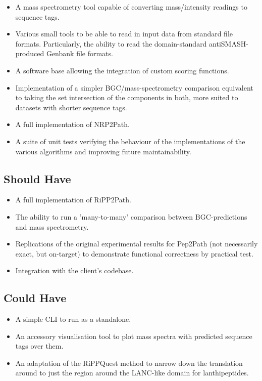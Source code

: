 \documentclass{l4proj}
\begin{document}
\begin{itemize}

\item A mass spectrometry tool capable of converting mass/intensity readings to sequence tags.
\item Various small tools to be able to read in input data from standard file formats. Particularly, the ability to read the domain-standard antiSMASH-produced Genbank file formats.
\item A software base allowing the integration of custom scoring functions.
\item Implementation of a simpler BGC/mass-spectrometry comparison equivalent to taking the set intersection of the components in both, more suited to datasets with shorter sequence tags.
\item A full implementation of NRP2Path.
\item A suite of unit tests verifying the behaviour of the implementations of the various algorithms and improving future maintainability.
\end{itemize}

\subsection{Should Have}

\begin{itemize}
\item A full implementation of RiPP2Path.
\item The ability to run a 'many-to-many' comparison between BGC-predictions and mass spectrometry.
\item Replications of the original experimental results for Pep2Path (not necessarily exact, but on-target) to demonstrate functional correctness by practical test.
\item Integration with the client's codebase.
\end{itemize}

\subsection{Could Have}

\begin{itemize}
\item A simple CLI to run as a standalone.
\item An accessory visualisation tool to plot mass spectra with predicted sequence tags over them.
\item An adaptation of the RiPPQuest method to narrow down the translation around to just the region around the LANC-like domain for lanthipeptides.
\end{itemize}
\end{document}
